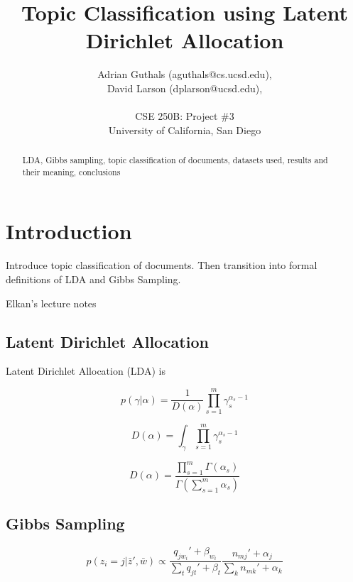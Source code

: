 \documentclass[10pt]{article}
\title{Topic Classification using Latent Dirichlet Allocation}
\author{Adrian Guthals (aguthals@cs.ucsd.edu),\\
David Larson (dplarson@ucsd.edu),\\
\\
CSE 250B: Project \#3 \\
University of California, San Diego \\
}
\begin{document}
\maketitle


\begin{abstract}
    LDA, Gibbs sampling, topic classification of documents, datasets used, results and their meaning, conclusions
\end{abstract}



\section{Introduction}
\label{sec:intro}

Introduce topic classification of documents. Then transition into formal definitions of LDA and Gibbs Sampling.

Elkan's lecture notes \cite{CSE250B}


\subsection{Latent Dirichlet Allocation}
\label{sec:lda}

Latent Dirichlet Allocation (LDA) is

\begin{equation}
    p(\gamma | \alpha) = \frac{1}{D(\alpha)} \prod_{s=1}^{m} \gamma_{s}^{\alpha_s - 1}
\end{equation}

\begin{equation}
    D(\alpha) = \int_{\gamma} \prod_{s=1}^m \gamma_s^{\alpha_s - 1}
\end{equation}

\begin{equation}
    D(\alpha) = \frac{\prod_{s=1}^m \Gamma(\alpha_s)}{\Gamma (\sum_{s=1}^m \alpha_s )}
\end{equation}



\subsection{Gibbs Sampling}
\label{sec:gibbs}

\begin{equation}
    p(z_i = j | \bar{z}', \bar{w}) \propto \frac{q_{j w_i}' + \beta_{w_i}}{\sum_t q_{jt}' + \beta_t} \frac{n_{mj}' + \alpha_j}{\sum_k n_{mk}' + \alpha_k}
\end{equation}
\end{document}
